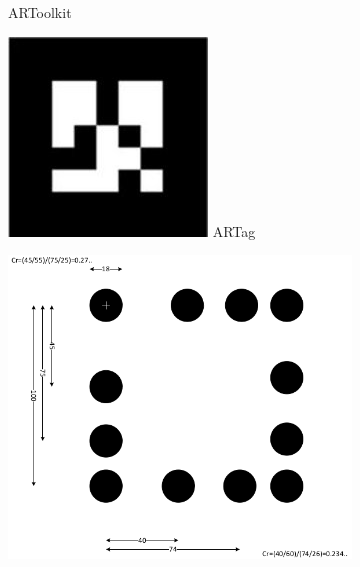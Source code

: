\documentclass[runningheads]{llncs}
\begin{document}
\begin{figure}
\begin{subfigure}[b]{0.19\textwidth}
  ARToolkit\cite{ARToolkit02}
 \end{subfigure}
 \begin{subfigure}[b]{0.19\textwidth}
  \centering
  \includegraphics[width=\linewidth]{ARtag.jpg}
  ARTag\cite{Fiala05}
 \end{subfigure}
 \begin{subfigure}[b]{0.19\textwidth}
  \centering
  \includegraphics[width=\linewidth]{pifiducial.png}

\end{subfigure}
\end{figure}
\end{document}
